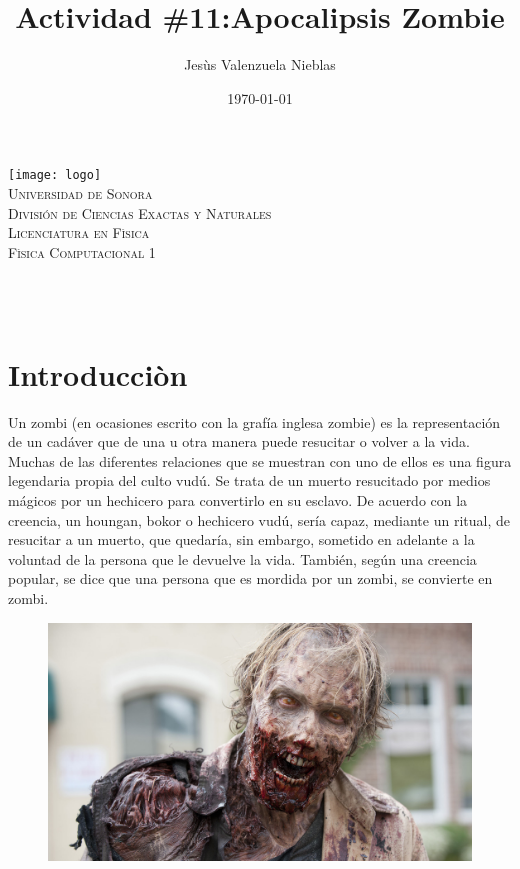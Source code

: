 \documentclass[12pt]{article}
\title{Actividad \#11:Apocalipsis Zombie}
\author{\Large Jesùs Valenzuela Nieblas\\}
\date{\today}
\makeatletter
\let\thetitle\@title
\let\theauthor\@author
\makeatother
\begin{document}

\begin{titlepage}
	\centering
    \vspace*{.5cm}
     \texttt{[image: logo]}\\	%
    \textsc{\Large Universidad de Sonora}\\[1.0 cm]	%
	\textsc{\Large División de Ciencias Exactas y Naturales}\\[.50 cm]
  	\textsc{\Large Licenciatura en Fìsica}\\[.5 cm]
  \textsc{\large Fìsica Computacional 1}\\[1.5 cm]				%
	
	{ \huge \bfseries \thetitle}\\

    \vspace*{3 cm}
	\begin{minipage}{\textwidth}
    \centering
    \theauthor
	\end{minipage}\\[3 cm]
	
 
	\vfill
	
\end{titlepage}


\section{Introducciòn}
Un zombi (en ocasiones escrito con la grafía inglesa zombie) es la representación de un cadáver que de una u otra manera puede resucitar o volver a la vida. Muchas de las diferentes relaciones que se muestran con uno de ellos es una figura legendaria propia del culto vudú. Se trata de un muerto resucitado por medios mágicos por un hechicero para convertirlo en su esclavo. De acuerdo con la creencia, un houngan, bokor o hechicero vudú, sería capaz, mediante un ritual, de resucitar a un muerto, que quedaría, sin embargo, sometido en adelante a la voluntad de la persona que le devuelve la vida. También, según una creencia popular, se dice que una persona que es mordida por un zombi, se convierte en zombi.
\begin{figure}[H]
\centering
\includegraphics[scale=.2]{zombie}
\end{figure}
\end{document}
